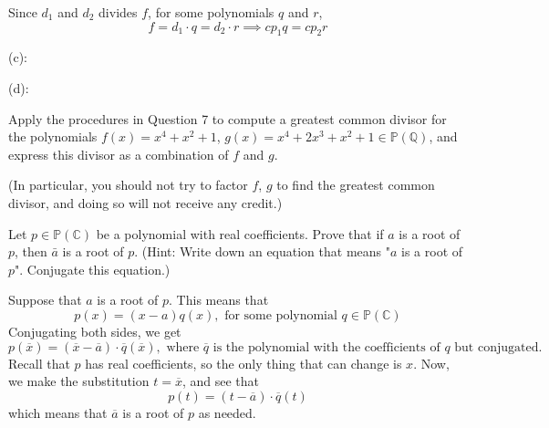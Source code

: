 \documentclass{article}
\theoremstyle{plain} %
\numberwithin{thm}{section} %
\theoremstyle{definition}
\begin{document}
\begin{question}{7}
        Since \(d_1\) and \(d_2\) divides \(f\), for some polynomials \(q\) and \(r\),
        \[
            f = d_1 \cdot q = d_2 \cdot r \implies c p_1 q = c p_2 r
        \]


        \medskip

        (c):

        

        \medskip

        (d):


    \end{question}
    \newpage
    \begin{question}{8}
        Apply the procedures in Question 7 to compute a greatest common divisor for the polynomials
        \(f(x) = x^4 + x^2 + 1\), \(g(x) = x^4 + 2x^3 + x^2 + 1 \in \mathbb{P}(\mathbb{Q})\), and express this divisor as a combination
        of \(f\) and \(g\).

        (In particular, you should not try to factor \(f\), \(g\) to find the greatest common divisor, and doing
        so will not receive any credit.)
    \end{question}
    \newpage
    \begin{question}{9}
        Let $p \in \mathbb{P}(\mathbb{C})$ be a polynomial with real coefficients. Prove that if $a$ is a root of $p$, then $\bar{a}$ is a root of $p$. (Hint: Write down an equation that means "$a$ is a root of $p$". Conjugate this equation.)

        \tcblower

        Suppose that \(a\) is a root of \(p\). This means that
        \[
            p(x) = (x - a)q(x), \text{ for some polynomial } q \in \mathbb{P}(\mathbb{C})
        \]
        Conjugating both sides, we get
        \[
            p(\overline{x}) = (\overline{x} - \overline{a})\cdot \overline{q}(\overline{x}), \text{ where } \overline{q} \text{ is the polynomial with the coefficients of } q \text{ but conjugated.}
        \]
        Recall that \(p\) has real coefficients, so the only thing that can change is \(x\). Now, we make the substitution \(t = \overline{x}\), and see that
        \[
            p(t) = (t - \overline{a}) \cdot \overline{q}(t)
        \]
        which means that \(\overline{a}\) is a root of \(p\) as needed.
    \end{question}
    \newpage
\end{document}
